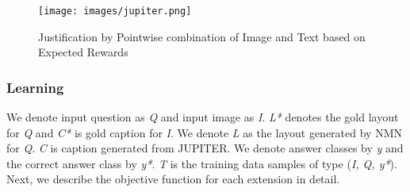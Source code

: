 \begin{figure}[h]
    \centering
    \texttt{[image: images/jupiter.png]}
    \caption{Justification by Pointwise combination of Image and Text based on Expected Rewards}
    \label{fig:jupiter}
\end{figure}
    
    
\subsubsection{Learning}
We denote input question as \textit{Q} and input image as \textit{I}. \textit{L*} denotes the gold layout for \textit{Q} and \textit{C*} is gold caption for \textit{I}. We denote \textit{L} as the layout generated by NMN for \textit{Q}. \textit{C} is caption generated from JUPITER. We denote answer classes by \textit{y} and the correct answer class by \textit{y*}. \textit{T} is the training data samples of type (\textit{I, Q, y*}). Next, we describe the objective function for each extension in detail. 
